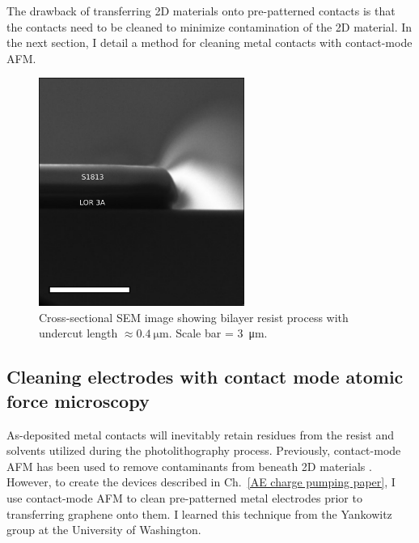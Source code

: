 \documentclass[double,12pt,1in,seploa]{beavtex}
\let\Oldsubsection\subsection
\renewcommand{\subsection}{\FloatBarrier\Oldsubsection}
\begin{document}
The drawback of transferring 2D materials onto pre-patterned contacts is that the contacts need to be cleaned to minimize contamination of the 2D material. In the next section, I detail a method for cleaning metal contacts with contact-mode AFM.


\begin{figure}
    \includegraphics[width = 0.6\textwidth]{LOR cross section_.png}
    \caption{Cross-sectional SEM image showing bilayer resist process with undercut length $\approx \SI{0.4}{\micro\meter}$. Scale bar = \SI{3}{\micro\meter}.}
    \label{fig:cross-section SEM}
\end{figure}

\subsection{Cleaning electrodes with contact mode atomic force microscopy} \label{AFM cleaning main section}

As-deposited metal contacts will inevitably retain residues from the resist and solvents utilized during the photolithography process. Previously, contact-mode AFM has been used to remove contaminants from beneath 2D materials \cite{goossens_mechanical_2012,chen_tip-based_2021}. However, to create the devices described in Ch.\ \ref{AE charge pumping paper}, I use contact-mode AFM to clean pre-patterned metal electrodes prior to transferring graphene onto them. I learned this technique from the Yankowitz group at the University of Washington.
\end{document}
